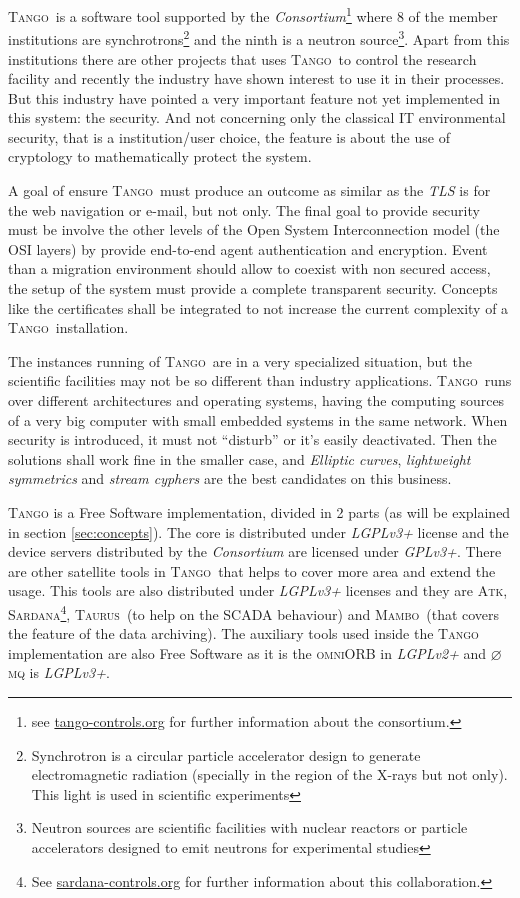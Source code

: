 \documentclass[10pt,a4paper,twoside]{llncs}
\newcommand{\tango}{\textsc{Tango}}
\newcommand{\atk}{\textsc{Atk}}
\newcommand{\sardana}{\textsc{Sardana}}
\newcommand{\taurus}{\textsc{Taurus}}
\newcommand{\mambo}{\textsc{Mambo}}
\newcommand{\omniorb}{\textsc{omniORB}}
\newcommand{\zmq}{\textsc{$\varnothing$mq}}
\begin{document}
\tango\, is a software tool supported by the \emph{Consortium}\footnote{see \href{https://www.tango-controls.org/}{tango-controls.org} for further information about the consortium.} where 8 of the member institutions are synchrotrons\footnote{Synchrotron is a circular particle accelerator design to generate electromagnetic radiation (specially in the region of the X-rays but not only). This light is used in scientific experiments} and the ninth is a neutron source\footnote{Neutron sources are scientific facilities with nuclear reactors or particle accelerators designed to emit neutrons for experimental studies}. Apart from this institutions there are other projects that uses \tango\, to control the research facility and recently the industry have shown interest to use it in their processes. But this industry have pointed a very important feature not yet implemented in this system: the security. And not concerning only the classical IT environmental security, that is a institution/user choice, the feature is 
about the use 
of cryptology to mathematically protect the 
system.

A goal of ensure \tango\, must produce an outcome as similar as the \emph{TLS} is for the web navigation or e-mail, but not only. The final goal to provide security must be involve the other levels of the Open System Interconnection model (the OSI layers) by provide end-to-end agent authentication and encryption. Event than a migration environment should allow to coexist with non secured access, the setup of the system must provide a complete transparent security. Concepts like the certificates shall be integrated to not increase the current complexity of a \tango\, installation.

The instances running of \tango\, are in a very specialized situation, but the scientific facilities may not be so different than industry applications. \tango\, runs over different architectures and operating systems, having the computing sources of a very big computer with small embedded systems in the same network. When security is introduced, it must not ``disturb'' or it's easily deactivated. Then the solutions shall work fine in the smaller case, and \emph{Elliptic curves}, \emph{lightweight symmetrics} and \emph{stream cyphers} are the best candidates on this business.

\tango\cite{tango81} is a Free Software implementation, divided in 2 parts (as will be explained in section \ref{sec:concepts}). The core is distributed under \emph{LGPLv3+} license and the device servers distributed by the \emph{Consortium} are licensed under \emph{GPLv3+}. There are other satellite tools in \tango\, that helps to cover more area and extend the usage. This tools are also distributed under \emph{LGPLv3+} licenses and they are \atk, \sardana\footnote{See \href{https://www.sardana-controls.org/}{sardana-controls.org} for further information about this collaboration.}, \taurus\, (to help on the SCADA behaviour) and \mambo\, (that covers the feature of the data archiving). The auxiliary tools used inside the \tango\, implementation are also Free Software as it is the \omniorb \cite{omniORB41} in \emph{LGPLv2+} and \zmq \cite{zmq32} is \emph{LGPLv3+}.
\end{document}
